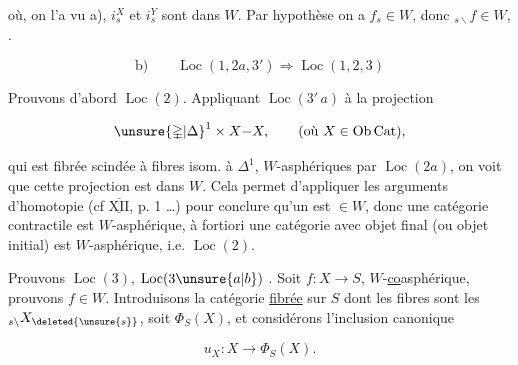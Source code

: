 

où, on l'a vu  a), $i_s^X$ et $i_s^Y$ sont dans $W$. Par hypothèse on a $f_s\in W$, donc $ {}_{s\backslash}f\in W$, .

\[
\text{b)}\qquad \operatorname{Loc}(1,2a,3')\Longrightarrow\operatorname{Loc}(1,2,3)
\]

Prouvons d'abord $\operatorname{Loc}(2)$. Appliquant $\operatorname{Loc}(3'\,a)$ à la projection

\[
\unsure{\mathbb{\Delta}|\Delta}^{1}\times X{-}X,\qquad(\text{où }X\in\operatorname{Ob}\mathrm{Cat}),
\]

 qui est fibrée scindée à fibres isom. à $\mathbb{\Delta}^{1}$,  $W$-asphériques par $\operatorname{Loc}(2a)$, on voit que cette projection est dans $W$. Cela permet d'appliquer les arguments  d'homotopie (cf $\overline{\underline{\mathrm{XII}}}$, p. 1 \ldots) pour conclure qu'un  est $\in W$, donc une catégorie contractile est $W$-asphérique, à fortiori une catégorie avec objet final (ou  objet initial) est $W$-asphérique,  i.e. $\operatorname{Loc}(2)$.


Prouvons $\operatorname{Loc}(3)$,  $\operatorname{Loc}(3\unsure{a|b})$  .  Soit $f:X\longrightarrow S$, $W$-\uline{co}asphérique, prouvons $f\in W$. Introduisons la catégorie \uline{fibrée} sur $S$ dont les fibres sont les $ {}_{s\backslash}X_{\deleted{\unsure{s}}}$, soit $\Phi_S(X)$, et considérons l'inclusion canonique

\[
u_X:X\longrightarrow\Phi_S(X).
\]



